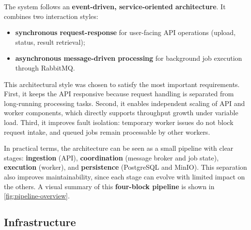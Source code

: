 \documentclass{scrartcl}
\begin{document}
The system follows an \textbf{event-driven, service-oriented architecture}.
It combines two interaction styles:

\begin{itemize}
  \item \textbf{synchronous request-response} for user-facing API operations (upload, status, result retrieval);
  \item \textbf{asynchronous message-driven processing} for background job execution through RabbitMQ.
\end{itemize}

This architectural style was chosen to satisfy the most important requirements.
First, it keeps the API responsive because request handling is separated from long-running processing tasks.
Second, it enables independent scaling of API and worker components, which directly supports throughput growth under variable load.
Third, it improves fault isolation: temporary worker issues do not block request intake, and queued jobs remain processable by other workers.

In practical terms, the architecture can be seen as a small pipeline with clear stages:
\textbf{ingestion} (API), \textbf{coordination} (message broker and job state), \textbf{execution} (worker), and \textbf{persistence} (PostgreSQL and MinIO).
This separation also improves maintainability, since each stage can evolve with limited impact on the others.
A visual summary of this \textbf{four-block pipeline} is shown in \cref{fig:pipeline-overview}.

\subsection{Infrastructure}\label{infrastructure}


\end{document}
